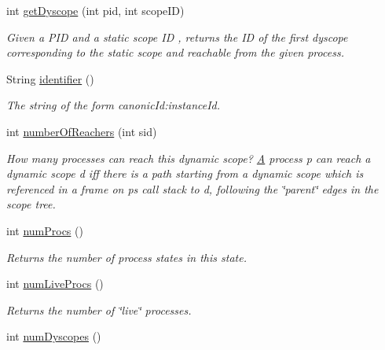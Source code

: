 \begin{DoxyCompactItemize}
int \hyperlink{classedu_1_1udel_1_1cis_1_1vsl_1_1civl_1_1state_1_1common_1_1immutable_1_1ImmutableState_ac222a1ccf643d72343e5930f9040ad0d}{get\+Dyscope} (int pid, int scope\+I\+D)
\begin{DoxyCompactList}\small\item\em Given a P\+I\+D and a static scope I\+D , returns the I\+D of the first dyscope corresponding to the static scope and reachable from the given process. \end{DoxyCompactList}\item 
String \hyperlink{classedu_1_1udel_1_1cis_1_1vsl_1_1civl_1_1state_1_1common_1_1immutable_1_1ImmutableState_a52b71faf5aa98c042887be640aa1b7f9}{identifier} ()
\begin{DoxyCompactList}\small\item\em The string of the form canonic\+Id\+:instance\+Id. \end{DoxyCompactList}\item 
int \hyperlink{classedu_1_1udel_1_1cis_1_1vsl_1_1civl_1_1state_1_1common_1_1immutable_1_1ImmutableState_ad4f0b956e1453a5c151a6002f99cbe56}{number\+Of\+Reachers} (int sid)
\begin{DoxyCompactList}\small\item\em How many processes can reach this dynamic scope? \hyperlink{structA}{A} process p can reach a dynamic scope d iff there is a path starting from a dynamic scope which is referenced in a frame on p\textquotesingle{}s call stack to d, following the \char`\"{}parent\char`\"{} edges in the scope tree. \end{DoxyCompactList}\item 
int \hyperlink{classedu_1_1udel_1_1cis_1_1vsl_1_1civl_1_1state_1_1common_1_1immutable_1_1ImmutableState_a8d1045d2449c3ec77246c8eed471ecf7}{num\+Procs} ()
\begin{DoxyCompactList}\small\item\em Returns the number of process states in this state. \end{DoxyCompactList}\item 
int \hyperlink{classedu_1_1udel_1_1cis_1_1vsl_1_1civl_1_1state_1_1common_1_1immutable_1_1ImmutableState_a40b5df9b191739ea0249a621d59ad8f2}{num\+Live\+Procs} ()
\begin{DoxyCompactList}\small\item\em Returns the number of \char`\"{}live\char`\"{} processes. \end{DoxyCompactList}\item 
int \hyperlink{classedu_1_1udel_1_1cis_1_1vsl_1_1civl_1_1state_1_1common_1_1immutable_1_1ImmutableState_ae596f2c842cbb9ac461f68adabf8cbcd}{num\+Dyscopes} ()

\end{DoxyCompactItemize}

